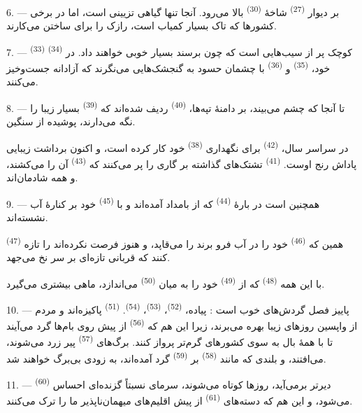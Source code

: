 \VUsaut{6.0mm}
\VUsaut{3.4mm}

6. --- بر دیوار  \textsuperscript{(27)} شاخهٔ
 \textsuperscript{(30)} بالا می‌رود. آنجا تنها گیاهی
تزیینی است، اما در برخی کشورها که تاک بسیار کمیاب است، رازک را برای
ساختن  می‌کارند.

7. ---  \textsuperscript{(33)} کوچک پر از سیب‌هایی است
که چون برسند  بسیار خوبی خواهند داد. در 
\textsuperscript{(34)} خود،  \textsuperscript{(35)} و
 \textsuperscript{(36)} با چشمان حسود به گنجشک‌هایی
می‌نگرند که آزادانه جست‌وخیز می‌کنند.

8. --- تا آنجا که چشم می‌بیند، بر دامنهٔ تپه‌ها، 
\textsuperscript{(40)} ردیف شده‌اند که 
\textsuperscript{(39)} بسیار زیبا را نگه می‌دارند، پوشیده از
 سنگین.

در سراسر سال،  \textsuperscript{(42)} برای نگهداری
 \textsuperscript{(38)} خود کار کرده است، و اکنون
برداشت زیبایی پاداش رنج اوست. 
\textsuperscript{(41)} تشتک‌های گذاشته بر گاری را پر می‌کنند که
 \textsuperscript{(43)} آن را می‌کشند، و همه شادمان‌اند.

\VUsaut{5.0mm}
\VUsaut{3.4mm}

9. --- همچنین است در بارهٔ 
\textsuperscript{(44)} که از بامداد آمده‌اند و با  \textsuperscript{(45)} خود بر کنارهٔ آب نشسته‌اند.

 \textsuperscript{(47)} همین که 
\textsuperscript{(46)} خود را در آب فرو برند  را می‌قاپد،
و هنوز فرصت نکرده‌اند  را تازه کنند که قربانی تازه‌ای بر
سر نخ می‌جهد.

با این همه  \textsuperscript{(48)} که از
 \textsuperscript{(49)} خود  را به
میان  \textsuperscript{(50)} می‌اندازد، ماهی بیشتری
می‌گیرد.

10. --- پاییز فصل گردش‌های خوب است : پیاده، 
\textsuperscript{(52)}،  \textsuperscript{(53)}،
 \textsuperscript{(54)}. 
\textsuperscript{(51)} پاکیزه‌اند و مردم از واپسین روزهای زیبا بهره
می‌برند، زیرا این هم که  \textsuperscript{(56)} از پیش
روی بام‌ها گرد می‌آیند تا با همهٔ بال به سوی کشورهای گرم‌تر پرواز
کنند. برگ‌های  \textsuperscript{(57)} پیر زرد
می‌شوند،  می‌افتند، و  بلندی که مانند
 \textsuperscript{(58)} بر 
\textsuperscript{(59)} گرد آمده‌اند، به زودی بی‌برگ خواهند شد.

11. ---  \textsuperscript{(60)} دیرتر برمی‌آید، روزها
کوتاه می‌شوند، سرمای نسبتاً گزنده‌ای  احساس می‌شود، و
این هم که دسته‌های  \textsuperscript{(61)} از پیش
اقلیم‌های میهمان‌ناپذیر ما را ترک می‌کنند.

\VUsaut{6.0mm}
\VUfilet{22mm}
